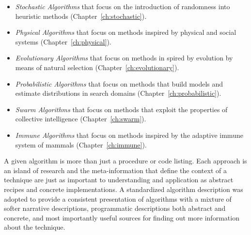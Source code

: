 \begin{bibunit}
\begin{itemize}
	\item \emph{Stochastic Algorithms} that focus on the introduction of randomness into heuristic methods (Chapter~\ref{ch:stochastic}).
	\item \emph{Physical Algorithms} that focus on methods inspired by physical and social systems  (Chapter~\ref{ch:physical}).
	\item \emph{Evolutionary Algorithms} that focus on methods in spired by evolution by means of natural selection (Chapter~\ref{ch:evolutionary}).
	\item \emph{Probabilistic Algorithms} that focus on methods that build models and estimate distributions in search domains (Chapter~\ref{ch:probabilistic}).
	\item \emph{Swarm Algorithms} that focus on methods that exploit the properties of collective intelligence (Chapter~\ref{ch:swarm}).
	\item \emph{Immune Algorithms} that focus on methods inspired by the adaptive immune system of mammals (Chapter~\ref{ch:immune}). 
\end{itemize}

A given algorithm is more than just a procedure or code listing. Each approach is an island of research and the meta-information that define the context of a technique are just as important to understanding and application as abstract recipes and concrete implementations. A standardized algorithm description was adopted to provide a consistent presentation of algorithms with a mixture of softer narrative descriptions, programmatic descriptions both abstract and concrete, and most importantly useful sources for finding out more information about the technique.  


\end{bibunit}
